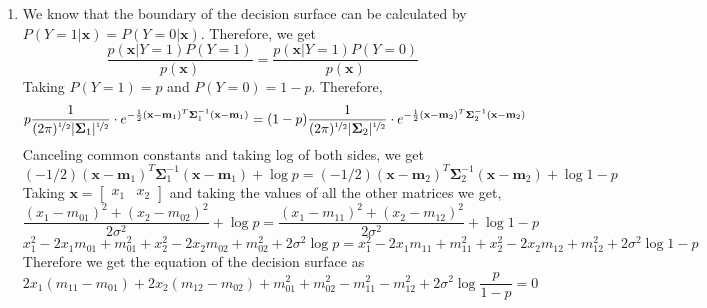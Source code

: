 \documentclass[twoside]{article}
\begin{document}
\begin{enumerate}
	
	\item
	We know that the boundary of the decision surface can be calculated by $P(Y=1|\mathbf{x})=P(Y=0|\mathbf{x})$.
	Therefore, we get
	\begin{equation*}
		\frac{p(\mathbf{x}|Y=1)P(Y=1)}{p(\mathbf{x})} = \frac{p(\mathbf{x}|Y=1)P(Y=0)}{p(\mathbf{x})}
	\end{equation*}
	Taking $P(Y=1) = p$ and $P(Y=0) = 1 - p$. Therefore,
	\begin{equation*}
		p\frac{1}{(2\pi)^{\nicefrac{1}{2}} |\mathbf{\Sigma}_{1}|^{\nicefrac{1}{2}}}\cdot e^{-\frac{1}{2}(\mathbf{x}-\mathbf{m}_{1})^{T}\mathbf{\Sigma}_{1}^{-1}(\mathbf{x}-\mathbf{m}_{1})} = (1-p)\frac{1}{(2\pi)^{\nicefrac{1}{2}} |\mathbf{\Sigma}_{2}|^{\nicefrac{1}{2}}}\cdot e^{-\frac{1}{2}(\mathbf{x}-\mathbf{m}_{2})^{T}\mathbf{\Sigma}_{2}^{-1}(\mathbf{x}-\mathbf{m}_{2})}
	\end{equation*}
	Canceling common constants and taking log of both sides, we get
	\begin{equation*}
	(-1/2)(\mathbf{x}-\mathbf{m}_{1})^{T}\mathbf{\Sigma}_{1}^{-1}(\mathbf{x}-\mathbf{m}_{1}) + \log p= (-1/2)(\mathbf{x}-\mathbf{m}_{2})^{T}\mathbf{\Sigma}_{2}^{-1}(\mathbf{x}-\mathbf{m}_{2}) + \log 1 - p
	\end{equation*}
	Taking $\mathbf{x} = \begin{bmatrix} x_1 & x_2 \end{bmatrix}$ and taking the values of all the other matrices we get,
	\begin{equation*}
		\frac{(x_1-m_{01})^2 + (x_2 - m_{02})^2}{2\sigma^2} + \log p = \frac{(x_1-m_{11})^2 + (x_2 - m_{12})^2}{2\sigma^2} + \log 1-p 
	\end{equation*}
	\begin{equation*}
		x_1^2-2x_1m_{01}+m_{01}^2 + x_2^2 -2x_2m_{02} + m_{02}^2 + 2\sigma^2\log p = x_1^2-2x_1m_{11}+m_{11}^2 + x_2^2 -2x_2m_{12} + m_{12}^2 + 2\sigma^2\log 1-p 
	\end{equation*}
	Therefore we get the equation of the decision surface as
	\begin{equation*}
		2x_1(m_{11}-m_{01}) + 2x_2(m_{12} - m_{02}) + m_{01}^2 + m_{02}^2 - m_{11}^2 - m_{12}^2 + 2\sigma^2\log\frac{p}{1-p} = 0
	\end{equation*}
	

\end{enumerate}
\end{document}
